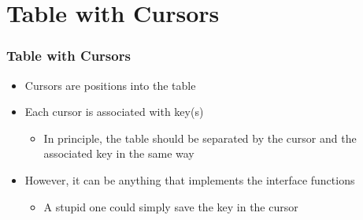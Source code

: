 \documentclass{beamer}
\begin{document}
\section{Table with Cursors}

\begin{frame}[t]
\frametitle{Table with Cursors}

\begin{itemize}
\item<1-> Cursors are positions into the table
\item<2-> Each cursor is associated with key(s)
  \begin{itemize}
  \item<3-> In principle, the table should be separated by the cursor and the
    associated key in the same way
    \begin{center}
    \end{center}
  \end{itemize}
\item<4-> However, it can be anything that implements the interface
  functions
  \begin{itemize}
  \item A stupid one could simply save the key in the cursor 
  \end{itemize}
\end{itemize}

\end{frame}
\end{document}
